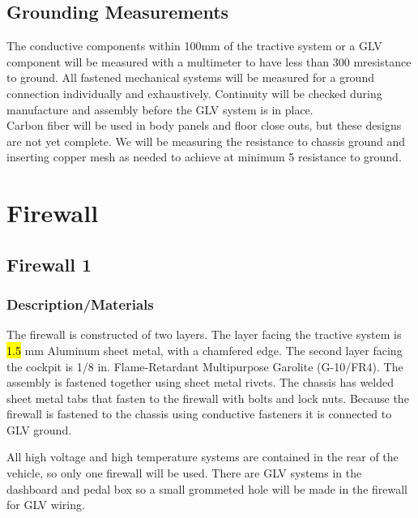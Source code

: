 \documentclass{article}
\DeclareRobustCommand{\hlr}[1]{{\sethlcolor{red}\hl{#1}}}
\begin{document}
    \subsection{Grounding Measurements}

        The conductive components within 100mm of the tractive system or a GLV component will be measured with a multimeter to have less than 300 m\ohm resistance to ground. All fastened mechanical systems will be measured for a ground connection individually and exhaustively. Continuity will be checked during manufacture and assembly before the GLV system is in place.\\
        
        Carbon fiber will be used in body panels and floor close outs, but these designs are not yet complete. We will be measuring the resistance to chassis ground and inserting copper mesh as needed to achieve at minimum 5 \ohm resistance to ground. 

\newpage

\section{Firewall}

    \subsection{Firewall 1}

        \subsubsection{Description/Materials}

            The firewall is constructed of two layers. The layer facing the tractive system is \hlr{1.5} mm Aluminum sheet metal, with a chamfered edge. The second layer facing the cockpit is 1/8 in. Flame-Retardant Multipurpose Garolite (G-10/FR4). The assembly is fastened together using sheet metal rivets. The chassis has welded sheet metal tabs that fasten to the firewall with bolts and lock nuts. Because the firewall is fastened to the chassis using conductive fasteners it is connected to GLV ground.
            
            All high voltage and high temperature systems are contained in the rear of the vehicle, so only one firewall will be used. There are GLV systems in the dashboard and pedal box so a small grommeted hole will be made in the firewall for GLV wiring.
            
\end{document}
